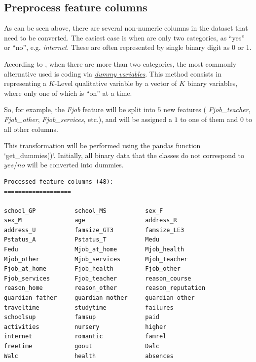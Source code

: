 \documentclass[a4paper]{article}
\begin{document}
\subsection{Preprocess feature columns}
As can be seen above, there are several non-numeric columns in the dataset that need to be converted. The easiest case is when are only two categories, as ``yes'' or ``no'', e.g. \textit{internet}. These are often represented by single binary digit as $0$ or $1$.

According to \cite{Hastie_2009}, when there are more than two categories, the most commonly alternative used is coding via \href{https://www.moresteam.com/whitepapers/download/dummy-variables.pdf}{\textit{dummy variables}}. This method consists in representing a $K$-Level qualitative variable by a vector of $K$ binary variables, where only one of which is ``on'' at a time.

So, for example, the \textit{Fjob} feature will be split into $5$ new features ( \textit{Fjob\_teacher}, \textit{Fjob\_other}, \textit{Fjob\_services}, etc.), and will be assigned a $1$ to one of them and $0$ to all other columns.

This transformation will be performed using the pandas function `get\_dummies()`. Initially, all binary data that the classes do not correspond to $yes$/$no$ will be converted into dummies.

\begin{lstlisting}
Processed feature columns (48):
===================

school_GP         	school_MS         	sex_F             
sex_M             	age               	address_R         
address_U         	famsize_GT3       	famsize_LE3       
Pstatus_A         	Pstatus_T         	Medu              
Fedu              	Mjob_at_home      	Mjob_health       
Mjob_other        	Mjob_services     	Mjob_teacher      
Fjob_at_home      	Fjob_health       	Fjob_other        
Fjob_services     	Fjob_teacher      	reason_course     
reason_home       	reason_other      	reason_reputation 
guardian_father   	guardian_mother   	guardian_other    
traveltime        	studytime         	failures          
schoolsup         	famsup            	paid              
activities        	nursery           	higher            
internet          	romantic          	famrel            
freetime          	goout             	Dalc              
Walc              	health            	absences  
\end{lstlisting}
\end{document}
